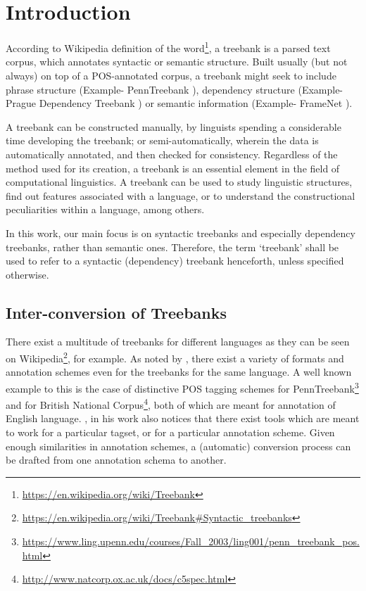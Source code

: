 \chapter{Introduction}

According to Wikipedia definition of the word\footnote{\url{https://en.wikipedia.org/wiki/Treebank}}, a treebank is a parsed text corpus, which annotates syntactic or semantic structure. Built usually (but not always) on top of a POS-annotated corpus, a treebank might seek to include phrase structure (Example- PennTreebank \citep{PennTreebank}), dependency structure (Example- Prague Dependency Treebank \citep{PDT}) or semantic information (Example- FrameNet \citep{framenet}).

A treebank can be constructed manually, by linguists spending a considerable time developing the treebank; or semi-automatically, wherein the data is automatically annotated, and then checked for consistency. Regardless of the method used for its creation, a treebank is an essential element in the field of computational linguistics. A treebank can be used to study linguistic structures, find out features associated with a language, or to understand the constructional peculiarities within a language, among others. 

In this work, our main focus is on syntactic treebanks and especially dependency treebanks, rather than semantic ones. Therefore, the term `treebank' shall be used to refer to a syntactic (dependency) treebank henceforth, unless specified otherwise.

\section{Inter-conversion of Treebanks}

There exist a multitude of treebanks for different languages as they can be seen on Wikipedia\footnote{\url{https://en.wikipedia.org/wiki/Treebank\#Syntactic_treebanks}}, for example. As noted by \cite{kakkonen2006}, there exist a variety of formats and annotation schemes even for the treebanks for the same language. A well known example to this is the case of distinctive POS tagging schemes for PennTreebank\footnote{\url{https://www.ling.upenn.edu/courses/Fall_2003/ling001/penn_treebank_pos.html}} and for British National Corpus\footnote{\url{http://www.natcorp.ox.ac.uk/docs/c5spec.html}}, both of which are meant for annotation of English language. \citeauthor{kakkonen2006}, in his work also notices that there exist tools which are meant to work for a particular tagset, or for a particular annotation scheme. Given enough similarities in annotation schemes, a (automatic) conversion process can be drafted from one annotation schema to another.

